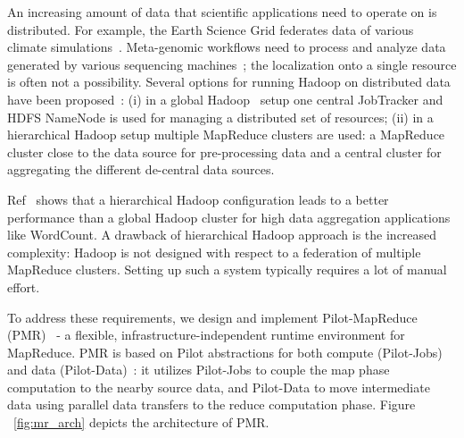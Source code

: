 \documentclass[]{paper}
\begin{document}
An increasing amount of data that scientific applications need to operate on is distributed. For example, the Earth Science Grid federates data of various climate simulations~\cite{ESG}. Meta-genomic workflows need to process and analyze data generated by various sequencing machines~\cite{Jha:2011fk}; the localization onto a single resource is often not a possibility.
Several options for running Hadoop on distributed data have been proposed~\cite{weissman-mr-11}: (i) in a global Hadoop~\cite{hadoop} setup one central JobTracker and HDFS NameNode is used for managing a distributed set of resources; (ii) in a hierarchical Hadoop setup multiple MapReduce clusters are used: a MapReduce cluster close to the data source for pre-processing data and a central cluster for aggregating the different de-central data sources.

Ref~\cite{weissman-mr-11} shows that a hierarchical Hadoop configuration leads to a better performance than a global Hadoop cluster for high data aggregation applications like WordCount. %
A drawback of hierarchical Hadoop approach is the increased complexity: Hadoop is not designed with respect to a federation of multiple MapReduce clusters. Setting up such a system typically requires a lot of manual effort.

To address these requirements, we design and implement Pilot-MapReduce (PMR)~\cite{pmr-2012} - a flexible, infrastructure-independent runtime environment for MapReduce. PMR is based on Pilot abstractions for both compute (Pilot-Jobs) and data (Pilot-Data)~\cite{pstar-2012}: it utilizes Pilot-Jobs to couple the map phase computation to the nearby source data, and Pilot-Data to move intermediate data using parallel data transfers to the reduce computation phase. Figure ~\ref{fig:mr_arch} depicts the architecture of PMR. 
\end{document}
